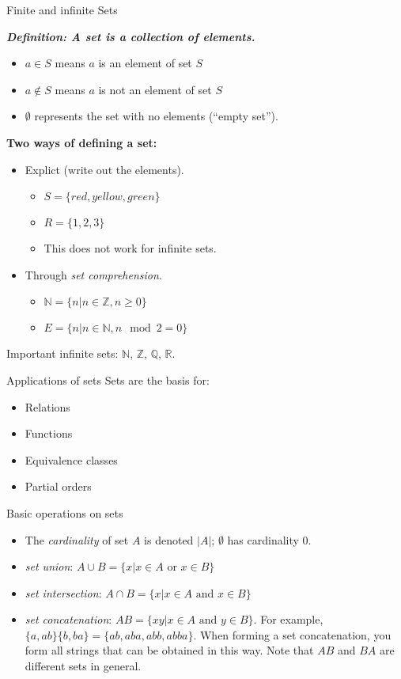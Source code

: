 \documentclass[style=sailor,size=12pt]{powerdot}
\newcommand{\bb}[1]{\mathbb{#1}}
\newcommand{\Z}{\bb{Z}}
\newcommand{\Q}{\bb{Q}}
\newcommand{\R}{\bb{R}}
\newcommand{\N}{\bb{N}}
\newcommand{\mli}[1]{\mathit{#1}}
\begin{document}
\begin{slide}[bm=,toc=]{Finite and infinite Sets}

\emph{\textbf{Definition: A set is a collection of elements.}}
\begin{itemize}
   \item $a \in S$ means $a$ is an element of set $S$ 
   \item $a \notin S$ means $a$ is not an element of set $S$
   \item $\emptyset$ represents the set with no elements (``empty set'').
\end{itemize} 

\textbf{Two ways of defining a set:}
\begin{itemize}
   \item Explict (write out the elements).
   \begin{itemize}
      \item $S = \{red, yellow, green\}$ 
      \item $R = \{1,2,3\}$
      \item This does not work for infinite sets.
   \end{itemize} 
   \item Through \emph{set comprehension}. 
   \begin{itemize}
      \item $\N = \{n| n \in \Z, n \geq 0\}$ 
      \item $E = \{n| n \in \N, n \mod{2} = 0 \}$
   \end{itemize}
\end{itemize} 

Important infinite sets: $\N$, $\Z$, $\Q$, $\R$.
\end{slide}

\begin{slide}[bm=,toc=]{Applications of sets}
Sets are the basis for:
\begin{itemize}
   \item Relations
   \item Functions
   \item Equivalence classes
   \item Partial orders
\end{itemize}
\end{slide}

\begin{slide}[bm=,toc=]{Basic operations on sets}
\begin{itemize}
   \item The \emph{cardinality} of set $A$ is denoted $|A|$; $\emptyset$ has
   cardinality 0. 
   \item \emph{set union}: $A \cup B = \{x|x \in A \text{ or } x \in B\}$
   \item \emph{set intersection}: $A \cap B = \{x|x \in A \text{ and } x \in B\}$
   \item \emph{set concatenation}: $\mli{AB} = \{xy | x \in A \text{ and } y \in
   B\}$. For example, $\{a,ab\}\{b,ba\} = \{ab,aba,abb,abba\}$. When forming a
   set concatenation, you form all strings that can be obtained in this way.
   Note that $\mli{AB}$ and $\mli{BA}$ are different sets in general.
\end{itemize}
\end{slide}
\end{document}
